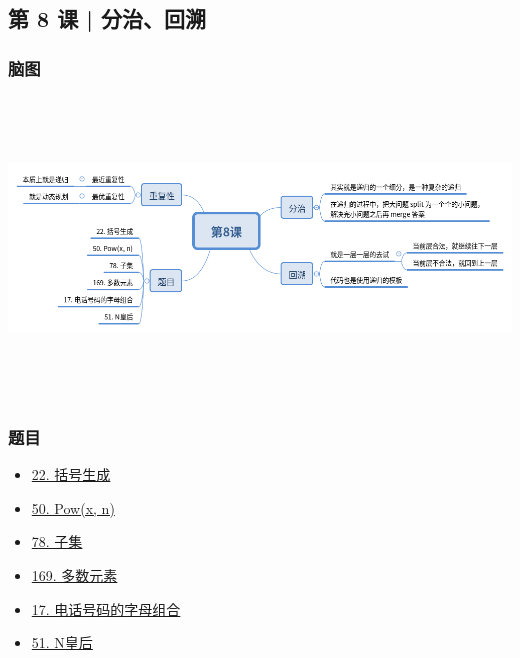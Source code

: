 \subsection{第 8 课 | 分治、回溯}

\subsubsection{脑图}

\includegraphics[width=170mm,height=80mm]{images/camp/第8课.png}

\subsubsection{题目}

\begin{itemize}
  \item \hyperref[leetcode:22]{22. 括号生成}
  \item \hyperref[leetcode:50]{50. Pow(x, n)}
  \item \hyperref[leetcode:78]{78. 子集}
  \item \hyperref[leetcode:169]{169. 多数元素}
  \item \hyperref[leetcode:17]{17. 电话号码的字母组合}
  \item \hyperref[leetcode:51]{51. N皇后}
\end{itemize}
